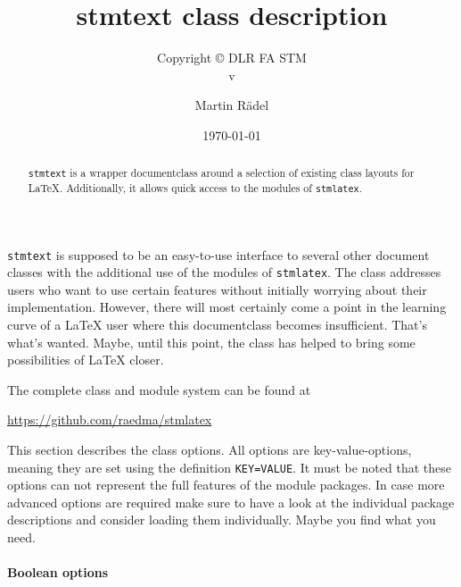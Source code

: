 \documentclass[%
  type=article,%
  layout=koma,%
  12pt,%
  page=false,%
  hyperref=true,%
  cleveref=true,
  conditionallox=true,
  conditionalloxnewpage=true,
  date=true,%
  index=true,%
  listings=true%
]{stmtext}
\author{Martin R\"{a}del}
\title{stmtext class description}
\subtitle{Copyright \copyright{} \the\year{} DLR FA STM\\v\formatdate[versiondatestyle]{\DTMToday}}
\date{\today}
\begin{document}
\maketitle

\begin{abstract}
\texttt{stmtext} is a wrapper documentclass around a selection of existing class layouts for \LaTeX. Additionally, it allows quick access to the modules of \texttt{stmlatex}.
\end{abstract}

\secondpage

\tableofcontents

\conditionallistoffigures  %
\conditionallistoftables   %
\conditionallistoflistings %

\setcounter{currentlevel}{\basetoclevelnr}
\label{sec:about}

\texttt{stmtext} is supposed to be an easy-to-use interface to several other document classes with the additional use of the modules of \texttt{stmlatex}. The class addresses users who want to use certain features without initially worrying about their implementation. However, there will most certainly come a point in the learning curve of a \LaTeX{} user where this documentclass becomes insufficient. That's what's wanted. Maybe, until this point, the class has helped to bring some possibilities of \LaTeX{} closer. 

The complete class and module system can be found at

\href{https://github.com/raedma/stmlatex}{https://github.com/raedma/stmlatex}


\setcounter{currentlevel}{\basetoclevelnr}
\label{sec:options}

This section describes the class options. All options are key-value-options, meaning they are set using the definition \texttt{KEY=VALUE}. It must be noted that these options can not represent the full features of the module packages. In case more advanced options are required make sure to have a look at the individual package descriptions and consider loading them individually. Maybe you find what you need.


\paragraph{Boolean options}
\end{document}
